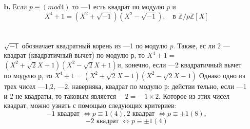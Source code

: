 \hspace*{15pt}\textbf{b.} Если $p \equiv (mod 4)$ то —1 есть квадрат по модулю $p$ и
$$X^{4} + 1 = (X^{2} + \sqrt{-1})(X^{2} - \sqrt{-1}),\quad\text{в }\mathbb{Z}/p\mathbb{Z}[X]$$\\
\\
$\sqrt{-1}$ обозначает квадратный корень из —1 по модулю $p$. Также, ес­\linebreak
ли 2 --- квадрат (квадратичный вычет) по модулю $р$, то $X^{4} + 1 = $\linebreak
$(X^{2} + \sqrt{2}X + 1)(X^{2} - \sqrt{2}X + 1)$и, конечно, если —2 квадратичный вычет\linebreak
по модулю $р$, то $X^{4} + 1 = (X^{2} + \sqrt{2}X - 1)(X^{2} - \sqrt{2}X - 1)$ Однако\linebreak
одно из трех чисел —1,2, —2, наверняка, квадрат по модулю $р$: действи­\linebreak
тельно, если —1 и 2 не-квадраты, то таковым является $—2 = —1 \times 2.$\linebreak
Которое из этих чисел квадрат, можно узнать с помощью следующих\linebreak
критериев:
$$-1\text{ квадрат }\Leftrightarrow p \equiv 1 (4), 2\text{ квадрат } \Leftrightarrow p \equiv \pm 1 (8),$$
$$-2\text{ квадрат }\Leftrightarrow p \equiv \pm 1 (4)$$


